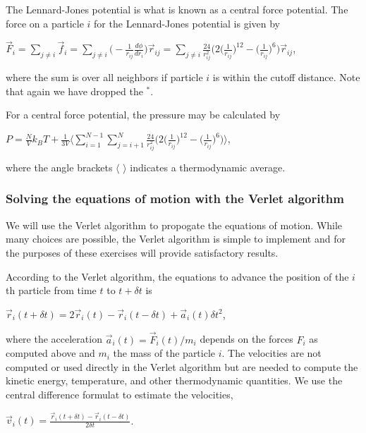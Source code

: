 \documentclass[11pt]{article}
\begin{document}
The Lennard-Jones potential is what is known as a central force
potential. The force on a particle \(i\) for the Lennard-Jones potential
is given by

\(\vec{F}_i = \sum_{j\neq i} \vec{f}_i = \sum_{j\neq i} \Big( -\frac{1}{r_{ij}}\frac{d\phi}{dr_i} \Big) \vec{r}_{ij} = \sum_{j \neq i} \frac{24}{r_{ij}^2} \Big( 2 \Big( \frac{1}{r_{ij}}\Big)^{12} - \Big( \frac{1}{r_{ij}}\Big)^6 \Big) \vec{r}_{ij}\),

where the sum is over all neighbors if particle \(i\) is within the
cutoff distance. Note that again we have dropped the \(^*\).

For a central force potential, the pressure may be calculated by

\(P = \frac{N}{V}k_B T + \frac{1}{3V}\Big\langle \sum_{i = 1}^{N-1} \sum_{j = i+1}^{N} \frac{24}{r_{ij}^2} \Big( 2 \Big( \frac{1}{r_{ij}}\Big)^{12} - \Big( \frac{1}{r_{ij}}\Big)^6 \Big) \Big\rangle\),

where the angle brackets \(\langle \,\, \rangle\) indicates a
thermodynamic average.

\hypertarget{solving-the-equations-of-motion-with-the-verlet-algorithm}{%
\subsubsection{Solving the equations of motion with the Verlet
algorithm}\label{solving-the-equations-of-motion-with-the-verlet-algorithm}}

We will use the Verlet algorithm to propogate the equations of motion.
While many choices are possible, the Verlet algorithm is simple to
implement and for the purposes of these exercises will provide
satisfactory results.

According to the Verlet algorithm, the equations to advance the position
of the \(i\)th particle from time \(t\) to \(t+\delta t\) is

\(\vec{r}_i(t+\delta t) = 2\vec{r}_i(t) - \vec{r}_i(t-\delta t) + \vec{a}_i(t)\delta t^2\),

where the acceleration \(\vec{a}_i(t) = \vec{F}_i(t)/m_i\) depends on
the forces \(F_i\) as computed above and \(m_i\) the mass of the
particle \(i\). The velocities are not computed or used directly in the
Verlet algorithm but are needed to compute the kinetic energy,
temperature, and other thermodynamic quantities. We use the central
difference formulat to estimate the velocities,

\(\vec{v}_i(t) = \frac{\vec{r}_i(t+\delta t)-\vec{r}_i(t-\delta t)}{2\delta t}\).
\end{document}
